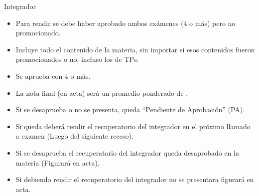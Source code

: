 \begin{frame}{Integrador}
  \small
  \begin{itemize}
    \item Para rendir se debe haber aprobado ambos exámenes (4 o más) pero no
      promocionado.
    \item Incluye todo el contenido de la materia, sin importar si esos contenidos
      fueron promocionados o no, incluso los de TPs.
    \item Se aprueba con 4 o más. 
    \item La nota final (en acta) será un promedio ponderado de .
    \item Si se desaprueba o no se presenta, queda ``Pendiente de Aprobación'' (PA).
    \item Si queda  deberá rendir el recuperatorio del integrador en el
      próximo llamado a examen (Luego del siguiente receso).
    \item Si se desaprueba el recuperatorio del integrador queda desaprobado en la
      materia (Figurará  en acta).
    \item Si debiendo rendir el recuperatorio del integrador no se presentara
      figurará  en acta.
  \end{itemize}
\end{frame}



